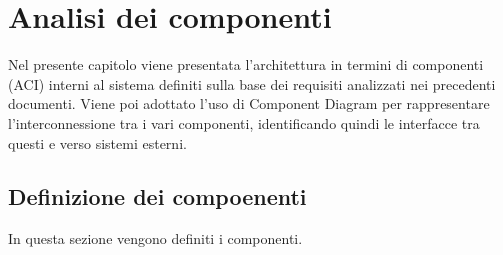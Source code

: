 \section{Analisi dei componenti}
\label{secD2:AnalisiDeiComponenti}

Nel presente capitolo viene presentata l'architettura in termini di componenti (ACI) interni al sistema definiti sulla base dei requisiti analizzati nei precedenti documenti. Viene poi adottato l'uso di Component Diagram per rappresentare l'interconnessione tra i vari componenti, identificando quindi le interfacce tra questi e verso sistemi esterni.

\subsection{Definizione dei compoenenti}
In questa sezione vengono definiti i componenti.

